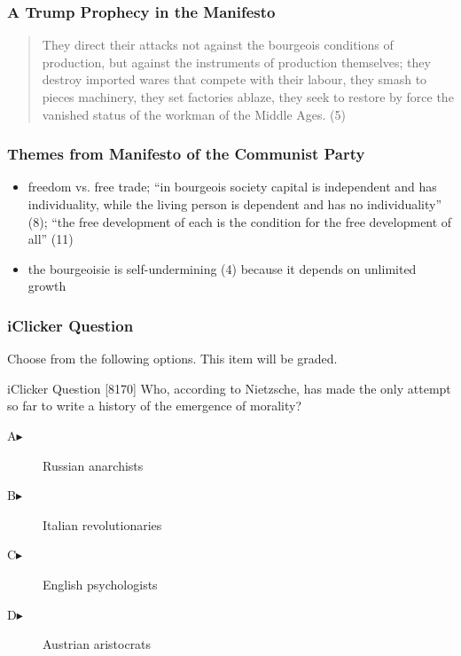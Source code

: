 \documentclass[xcolor=dvipsnames]{beamer}
\begin{document}
\begin{frame}
  \frametitle{A Trump Prophecy in the Manifesto}
  \begin{quote}
    They direct their attacks not against the bourgeois conditions of
    production, but against the instruments of production themselves;
    they destroy imported wares that compete with their labour, they
    smash to pieces machinery, they set factories ablaze, they seek to
    restore by force the vanished status of the workman of the Middle
    Ages. (5)
  \end{quote}
\end{frame}

\begin{frame}
  \frametitle{Themes from Manifesto of the Communist Party}
  \begin{itemize}
  \item<1-> freedom vs. free trade; ``in bourgeois society capital is
    independent and has individuality, while the living person is
    dependent and has no individuality'' (8); ``the free development
    of each is the condition for the free development of all'' (11)
  \item<2-> the bourgeoisie is self-undermining (4) because it depends
    on unlimited growth
  \end{itemize}
\end{frame}

\begin{frame}
  \frametitle{iClicker Question}
Choose from the following options. This item will be graded.
\begin{block}{iClicker Question}
[8170] Who, according to Nietzsche, has made the only attempt so far to write a history of the emergence of morality?
\end{block}
\begin{description}
\item[A\hspace{.2in}$\blacktriangleright$] Russian anarchists
\item[B\hspace{.2in}$\blacktriangleright$] Italian revolutionaries
\item[C\hspace{.2in}$\blacktriangleright$] English psychologists
\item[D\hspace{.2in}$\blacktriangleright$] Austrian aristocrats
\end{description}
\end{frame}
\end{document}
